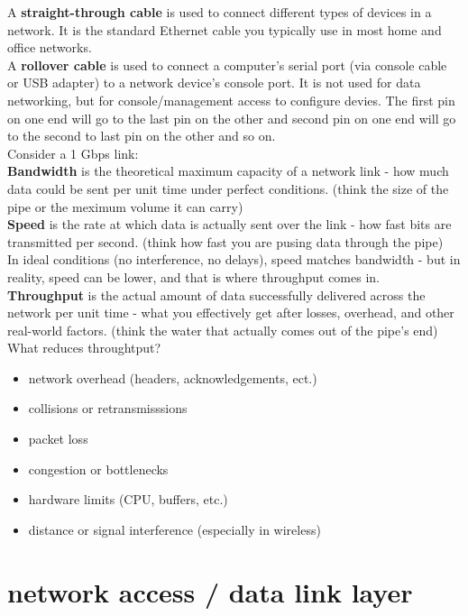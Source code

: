 \documentclass{article}
\begin{document}
A \textbf{straight-through cable} is used to connect different types of devices in a network. It is the standard Ethernet cable you typically use in most home and office networks.\\

A \textbf{rollover cable} is used to connect a computer's serial port (via console cable or USB adapter) to a network device's console port. It is not used for data networking, but for console/management access to configure devies. The first pin on one end will go to the last pin on the other and second pin on one end will go to the second to last pin on the other and so on.\\

Consider a 1 Gbps link:\\
\textbf{Bandwidth} is the theoretical maximum capacity of a network link - how much data could be sent per unit time under perfect conditions. (think the size of the pipe or the meximum volume it can carry)\\
\textbf{Speed} is the rate at which data is actually sent over the link - how fast bits are transmitted per second. (think how fast you are pusing data through the pipe)\\

In ideal conditions (no interference, no delays), speed matches bandwidth - but in reality, speed can be lower, and that is where throughput comes in.\\

\textbf{Throughput} is the actual amount of data successfully delivered across the network per unit time - what you effectively get after losses, overhead, and other real-world factors. (think the water that actually comes out of the pipe's end)\\

What reduces throughtput?
	\begin{itemize}
		\item network overhead (headers, acknowledgements, ect.)
		\item collisions or retransmisssions
		\item packet loss
		\item congestion or bottlenecks
		\item hardware limits (CPU, buffers, etc.)
		\item distance or signal interference (especially in wireless)
	\end{itemize}

\section*{network access / data link layer}
\end{document}
